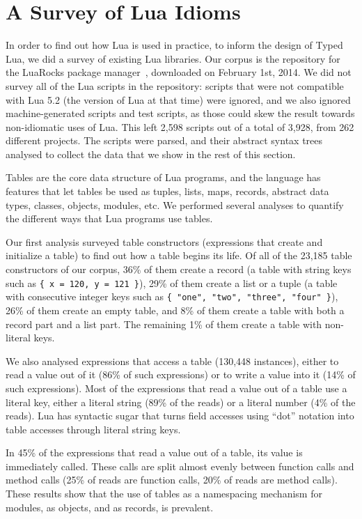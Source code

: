 \documentclass{sigplanconf}
\begin{document}
\section{A Survey of Lua Idioms}
\label{sec:statistics}

In order to find out how Lua is used in practice, to inform
the design of Typed Lua, we did a survey of existing Lua
libraries. Our corpus is the repository for the LuaRocks
package manager~\cite{hisham2013luarocks}, downloaded on
February 1st, 2014. We did not survey all of the Lua
scripts in the repository: scripts that were not compatible
with Lua 5.2 (the version of Lua at that time) were ignored,
and we also ignored machine-generated scripts and test scripts,
as those could skew the result towards non-idiomatic uses
of Lua. This left 2,598 scripts out of a total of 3,928, from
262 different projects. The scripts were parsed, and their
abstract syntax trees analysed to collect the data that we
show in the rest of this section.

Tables are the core data structure of Lua programs, and
the language has features that let tables be used as
tuples, lists, maps, records, abstract data types, classes,
objects, modules, etc. We performed several analyses to
quantify the different ways that Lua programs use tables.

Our first analysis surveyed table constructors (expressions
that create and initialize a table) to find out how a table
begins its life. Of all of the 23,185 table constructors of
our corpus, 36\% of them create a record (a table with string
keys such as \texttt{\{ x = 120, y = 121 \}}), 29\% of them create
a list or a tuple (a table with consecutive integer keys such as \texttt{\{ "one", "two", "three", "four" \}}), 26\% of them create an empty table, and 8\% of them create a table with
both a record part and a list part. The remaining 1\% of them create a table with non-literal keys.

We also analysed expressions that access a table (130,448 instances), either to read a value out of it (86\% of such expressions) or to write a 
value into it (14\% of such expressions). Most of the expressions
that read a value out of a table use a literal key,
either a literal string (89\% of the reads) or a literal
number (4\% of the reads). Lua has syntactic sugar that
turns field accesses using ``dot'' notation into table
accesses through literal string keys.

In 45\% of the expressions that read a value out of a table,
its value is immediately called. These calls are split almost
evenly between function calls and method calls (25\% of reads
are function calls, 20\% of reads are method calls).
These results show that the use of tables as a namespacing
mechanism for modules, as objects, and as records, 
is prevalent.
\end{document}
